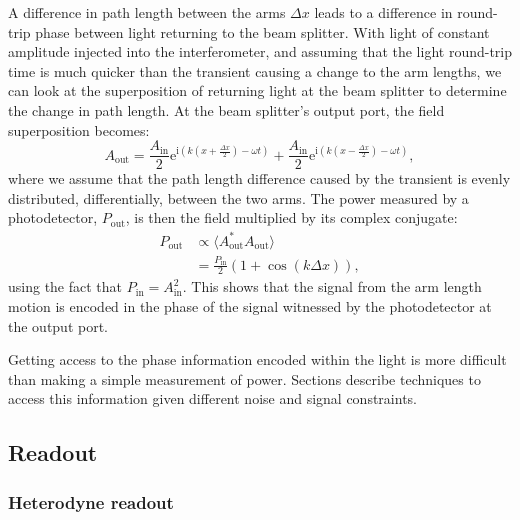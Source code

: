 A difference in path length between the arms $\Delta x$ leads to a difference in round-trip phase between light returning to the beam splitter. With light of constant amplitude injected into the interferometer, and assuming that the light round-trip time is much quicker than the transient causing a change to the arm lengths, we can look at the superposition of returning light at the beam splitter to determine the change in path length. At the beam splitter's output port, the field superposition becomes:
\begin{equation}
  A_{\text{out}} = \frac{A_{\text{in}}}{2} \text{e}^{\text{i} \left( k \left( x + \frac{\Delta x}{2} \right) - \omega t \right)} + \frac{A_{\text{in}}}{2} \text{e}^{\text{i} \left( k \left( x - \frac{\Delta x}{2} \right) - \omega t \right)},
\end{equation}
where we assume that the path length difference caused by the transient is evenly distributed, differentially, between the two arms. The power measured by a photodetector, $P_{\text{out}}$, is then the field multiplied by its complex conjugate:
\begin{equation}
  \label{eq:mich-p-out}
  \begin{split}
    P_{\text{out}} &\propto \langle A_{\text{out}}^*A_{\text{out}} \rangle \\
                   &= \frac{P_{\text{in}}}{2} \left( 1 + \cos \left( k \Delta x \right) \right),
  \end{split}
\end{equation}
using the fact that $P_{\text{in}} = A_{\text{in}}^2$. This shows that the signal from the arm length motion is encoded in the phase of the signal witnessed by the photodetector at the output port.

Getting access to the phase information encoded within the light is more difficult than making a simple measurement of power. Sections  describe techniques to access this information given different noise and signal constraints.


\subsection{\label{sec:readout}Readout}


\subsubsection{Heterodyne readout}

